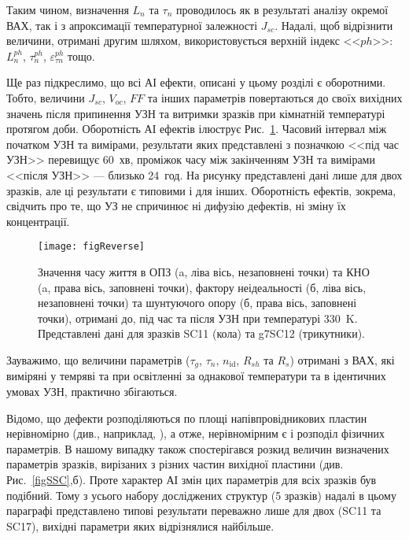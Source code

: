 Таким чином, визначення $L_n$ та $\tau_n$ проводилось як в результаті аналізу окремої ВАХ, так і з апроксимації
температурної залежності $J_{sc}$.
Надалі, щоб відрізнити величини, отримані другим шляхом, використовується верхній індекс <<$ph$>>: $L_n^{ph}$, $\tau_n^{ph}$, $\varepsilon_{\tau n}^{ph}$ тощо.

Ще раз підкреслимо, що всі АІ ефекти, описані у цьому розділі є оборотними.
Тобто, величини $J_{sc}$, $V_{oc}$, $F\!F$ та інших параметрів повертаються до своїх вихідних значень
після припинення УЗН  та витримки зразків при кімнатній температурі протягом доби.
Оборотність АІ ефектів ілюструє Рис.~\ref{figReverse}.
Часовий інтервал між початком УЗН та вимірами, результати яких представлені з позначкою <<під час УЗН>>
перевищує 60~хв, проміжок часу між закінченням УЗН та вимірами <<після УЗН>> --- близько 24~год.
На рисунку представлені дані лише для двох зразків, але ці результати є типовими і для інших.
Оборотність ефектів, зокрема, свідчить про те, що УЗ не спричинює ні дифузію дефектів,
ні зміну їх концентрації.

\begin{figure}
\center
\texttt{[image: figReverse]}%
\caption{\label{figReverse}
Значення часу життя в ОПЗ (a, ліва вісь, незаповнені точки)
та КНО (a, права вісь, заповнені точки),
фактору неідеальності (б, ліва вісь, незаповнені точки) та
шунтуючого опору (б, права вісь, заповнені точки),
отримані до, під час та після УЗН при температурі 330~K.
Представлені дані для зразків SC11 (кола) та g7SC12 (трикутники).
}%
\end{figure}


Зауважимо, що величини параметрів ($\tau_g$, $\tau_n$, $n_{\mathrm{id}}$, $R_{sh}$ та $R_s$) отримані з ВАХ, які виміряні у темряві та при освітленні за однакової температури
та в ідентичних умовах УЗН, практично збігаються.


Відомо, що дефекти розподіляються по площі напівпровідникових пластин нерівномірно (див., наприклад, \cite{Oxide:Chen,Oxide_Schon}),
а отже, нерівномірним є і розподіл фізичних параметрів.
В нашому випадку також спостерігався розкид величин визначених параметрів зразків, вирізаних з різних частин вихідної пластини (див. Рис.~\ref{figSSC},б).
Проте характер АІ змін цих параметрів для всіх зразків був подібний.
Тому з усього набору досліджених структур (5 зразків) надалі в цьому параграфі представлено типові результати переважно лише для двох (SC11 та SC17),
вихідні параметри яких відрізнялися найбільше.



